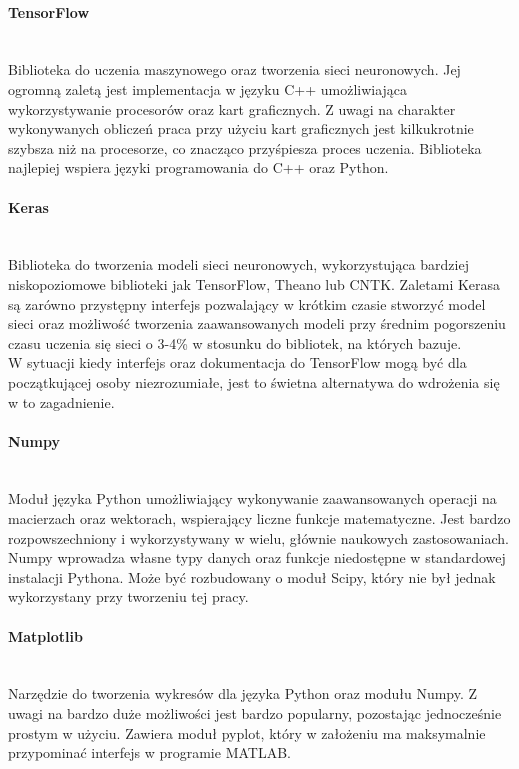 \paragraph{TensorFlow} \mbox{}\\
Biblioteka do uczenia maszynowego oraz tworzenia sieci neuronowych. Jej ogromną
zaletą jest implementacja w języku C++ umożliwiająca wykorzystywanie procesorów oraz
kart graficznych. Z uwagi na charakter wykonywanych obliczeń praca przy użyciu
kart graficznych jest kilkukrotnie szybsza niż na procesorze, co znacząco przyśpiesza
proces uczenia. Biblioteka najlepiej wspiera języki programowania do C++ oraz Python.

\paragraph{Keras} \mbox{}\\
Biblioteka do tworzenia modeli sieci neuronowych, wykorzystująca bardziej niskopoziomowe
biblioteki jak TensorFlow, Theano lub CNTK. Zaletami Kerasa są
zarówno przystępny interfejs pozwalający w krótkim czasie stworzyć model sieci
oraz możliwość tworzenia zaawansowanych modeli przy średnim pogorszeniu czasu
uczenia się sieci o 3-4\% w stosunku do bibliotek, na których bazuje.\\
W sytuacji kiedy interfejs oraz dokumentacja do TensorFlow mogą być dla początkującej
osoby niezrozumiałe, jest to świetna alternatywa do wdrożenia się w to zagadnienie.

\paragraph{Numpy} \mbox{}\\
Moduł języka Python umożliwiający wykonywanie zaawansowanych operacji na macierzach
oraz wektorach, wspierający liczne funkcje matematyczne. Jest bardzo rozpowszechniony
i wykorzystywany w wielu, głównie naukowych zastosowaniach. Numpy wprowadza własne
typy danych oraz funkcje niedostępne w standardowej instalacji Pythona. Może być
rozbudowany o moduł Scipy, który nie był jednak wykorzystany przy tworzeniu tej pracy.

\paragraph{Matplotlib} \mbox{}\\
Narzędzie do tworzenia wykresów dla języka Python oraz modułu Numpy. Z uwagi na
bardzo duże możliwości jest bardzo popularny, pozostając jednocześnie prostym w
użyciu. Zawiera moduł pyplot, który w założeniu ma maksymalnie przypominać interfejs
w programie MATLAB.

